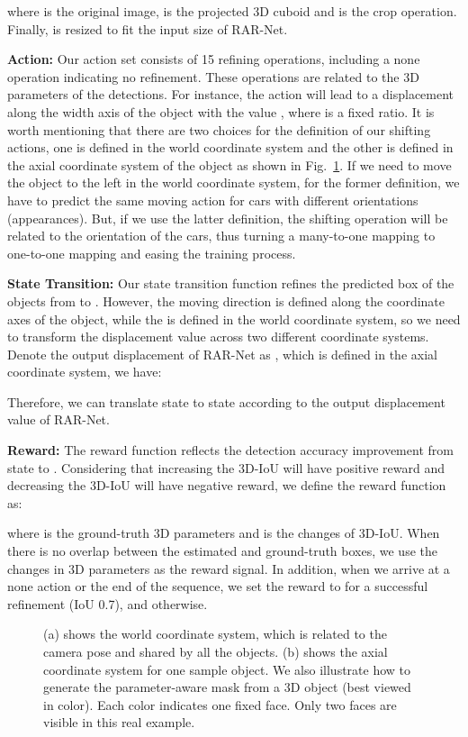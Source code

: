 \documentclass[runningheads]{llncs}
\begin{document}
where  is the original image,  is the projected 3D cuboid and  is the crop operation. Finally,  is resized to fit the input size of RAR-Net.
 
\noindent
\textbf{Action:} Our action set  consists of 15 refining operations, including a none operation indicating no refinement. These operations are related to the 3D parameters of the detections. For instance, the action  will lead to a displacement along the width axis of the object with the value , where  is a fixed ratio. It is worth mentioning that there are two choices for the definition of our shifting actions, one is defined in the world coordinate system and the other is defined in the axial coordinate system of the object as shown in Fig.~\ref{fig:sample}. If we need to move the object to the left in the world coordinate system, for the former definition, we have to predict the same moving action for cars with different orientations (appearances). But, if we use the latter definition, the shifting operation will be related to the orientation of the cars, thus turning a many-to-one mapping to one-to-one mapping and easing the training process. 

\noindent
\textbf{State Transition:} Our state transition function  refines the predicted box of the objects from  to . However, the moving direction is defined along the coordinate axes of the object, while the  is defined in the world coordinate system, so we need to transform the displacement value across two different coordinate systems. Denote the output displacement of RAR-Net as , which is defined in the axial coordinate system, we have:

Therefore, we can translate state  to state  according to the output displacement value of RAR-Net.

\noindent
\textbf{Reward:} The reward function  reflects the detection accuracy improvement from state  to . Considering that increasing the 3D-IoU will have positive reward and decreasing the 3D-IoU will have negative reward, we define the reward function as:

where  is the ground-truth 3D parameters and  is the changes of 3D-IoU. When there is no overlap between the estimated and ground-truth boxes, we use the changes in 3D parameters as the reward signal. In addition, when we arrive at a none action or the end of the sequence, we set the reward to  for a successful refinement (IoU  0.7), and  otherwise.

\begin{figure}[t]
\centering
{}
\caption{(a) shows the world coordinate system, which is related to the camera pose and shared by all the objects. (b) shows the axial coordinate system for one sample object. We also illustrate how to generate the parameter-aware mask from a 3D object (best viewed in color). Each color indicates one fixed face. Only two faces are visible in this real example.}
\label{fig:sample}
\end{figure}
\end{document}
